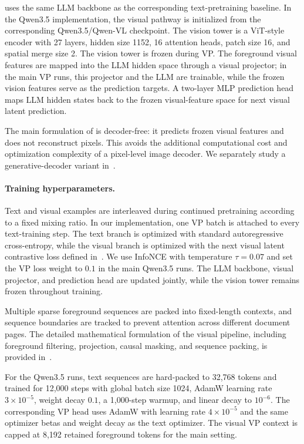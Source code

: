 \methodname uses the same LLM backbone as the corresponding text-pretraining baseline. In the Qwen3.5 implementation, the visual pathway is initialized from the corresponding Qwen3.5/Qwen-VL checkpoint. The vision tower is a ViT-style encoder with 27 layers, hidden size 1152, 16 attention heads, patch size 16, and spatial merge size 2. The vision tower is frozen during VP. The foreground visual features are mapped into the LLM hidden space through a visual projector; in the main VP runs, this projector and the LLM are trainable, while the frozen vision features serve as the prediction targets. A two-layer MLP prediction head maps LLM hidden states back to the frozen visual-feature space for next visual latent prediction.

The main formulation of \methodname is decoder-free: it predicts frozen visual features and does not reconstruct pixels. This avoids the additional computational cost and optimization complexity of a pixel-level image decoder. We separately study a generative-decoder variant in~.

\paragraph{Training hyperparameters.}
\label{sec:appendix_training_hparams}

Text and visual examples are interleaved during continued pretraining according to a fixed mixing ratio. In our implementation, one VP batch is attached to every text-training step. The text branch is optimized with standard autoregressive cross-entropy, while the visual branch is optimized with the next visual latent contrastive loss defined in~. We use InfoNCE with temperature $\tau=0.07$ and set the VP loss weight to $0.1$ in the main Qwen3.5 runs. The LLM backbone, visual projector, and prediction head are updated jointly, while the vision tower remains frozen throughout training.

Multiple sparse foreground sequences are packed into fixed-length contexts, and sequence boundaries are tracked to prevent attention across different document pages. The detailed mathematical formulation of the visual pipeline, including foreground filtering, projection, causal masking, and sequence packing, is provided in~.

For the Qwen3.5 runs, text sequences are hard-packed to 32,768 tokens and trained for 12,000 steps with global batch size 1024, AdamW learning rate $3\times10^{-5}$, weight decay $0.1$, a 1,000-step warmup, and linear decay to $10^{-6}$. The corresponding VP head uses AdamW with learning rate $4\times10^{-5}$ and the same optimizer betas and weight decay as the text optimizer. The visual VP context is capped at 8,192 retained foreground tokens for the main setting. 


